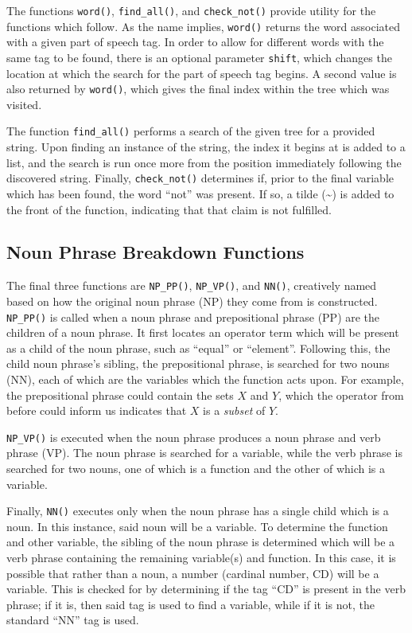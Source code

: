 The functions \texttt{word()}, \texttt{find\_all()}, and \texttt{check\_not()} provide utility for the functions which follow. As the name implies, \texttt{word()} returns the word associated with a given part of speech tag. In order to allow for different words with the same tag to be found, there is an optional parameter \texttt{shift}, which changes the location at which the search for the part of speech tag begins. A second value is also returned by \texttt{word()}, which gives the final index within the tree which was visited.

The function \texttt{find\_all()} performs a search of the given tree for a provided string. Upon finding an instance of the string, the index it begins at is added to a list, and the search is run once more from the position immediately following the discovered string. Finally, \texttt{check\_not()} determines if, prior to the final variable which has been found, the word ``not'' was present. If so, a tilde (\sim) is added to the front of the function, indicating that that claim is not fulfilled.

\subsection{Noun Phrase Breakdown Functions}

The final three functions are \texttt{NP\_PP()}, \texttt{NP\_VP()}, and \texttt{NN()}, creatively named based on how the original noun phrase (NP) they come from is constructed. \texttt{NP\_PP()} is called when a noun phrase and prepositional phrase (PP) are the children of a noun phrase. It first locates an operator term which will be present as a child of the noun phrase, such as ``equal'' or ``element''. Following this, the child noun phrase's sibling, the prepositional phrase, is searched for two nouns (NN), each of which are the variables which the function acts upon. For example, the prepositional phrase could contain the sets $X$ and $Y$, which the operator from before could inform us indicates that $X$ is a \textit{subset} of $Y$.

\label{npvp}
\texttt{NP\_VP()} is executed when the noun phrase produces a noun phrase and verb phrase (VP). The noun phrase is searched for a variable, while the verb phrase is searched for two nouns, one of which is a function and the other of which is a variable.

Finally, \texttt{NN()} executes only when the noun phrase has a single child which is a noun. In this instance, said noun will be a variable. To determine the function and other variable, the sibling of the noun phrase is determined which will be a verb phrase containing the remaining variable(s) and function. In this case, it is possible that rather than a noun, a number (cardinal number, CD) will be a variable. This is checked for by determining if the tag ``CD'' is present in the verb phrase; if it is, then said tag is used to find a variable, while if it is not, the standard ``NN'' tag is used.

